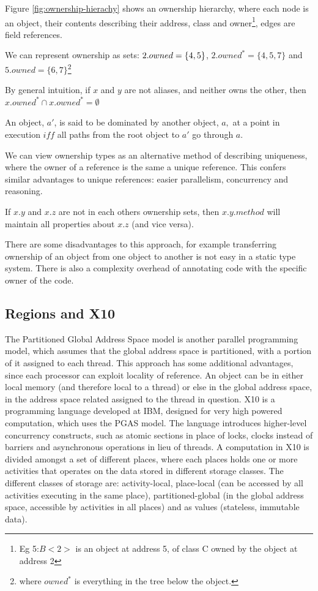 \documentclass[pdftex,11pt,a4paper]{report}
\begin{document}
Figure \ref{fig:ownership-hierachy} shows an ownership hierarchy, where each node is an object, their contents describing their address, class and owner\footnote{Eg 5:$B<2>$ is an object at address 5, of class C owned by the object at address 2}, edges are field references.

We can represent ownership as sets:
$\/2.owned=\{4,5\}$, $2.owned^{*}=\{4,5,7\}$ and $5.owned=\{6,7\}$\footnote{where $owned^{*}$ is everything in the tree below the object.}

By general intuition, if $x$ and $y$ are not aliases, and neither owns the other, then $x.owned^{*} \cap x.owned^{*} = \emptyset$

An object, $a'$, is said to be dominated by another object, $a,$ at a point in execution $iff$ all paths from the root object to $a'$ go through $a$.

We can view ownership types as an alternative method of describing uniqueness, where the owner of a reference is the same a unique reference.
This confers similar advantages to unique references: easier parallelism, concurrency and reasoning.

If $x.y$ and $x.z$ are not in each others ownership sets, then $x.y.method$ will maintain
all properties about $x.z$ (and vice versa).

There are some disadvantages to this approach, for example transferring ownership of an object from one object to another is not easy in a static type system\cite{clarke1998}.
There is also a complexity overhead of annotating code with the specific owner of the code.

\subsection{Regions and X10}
\label{sec:regions}

The Partitioned Global Address Space model\cite{pgas} is another parallel programming model, which assumes that the global address space is partitioned, with a portion of it assigned to each thread.
This approach has some additional advantages, since each processor can exploit locality of reference.
An object can be in either local memory (and therefore local to a thread) or else in the global address space, in the address space related assigned to the thread in question.
X10 is a programming language developed at IBM, designed for very high powered computation, which uses the PGAS model.
The language introduces higher-level concurrency constructs, such as atomic sections in place of locks, clocks instead of barriers and asynchronous operations in lieu of threads\cite{x10}.
A computation in X10 is divided amongst a set of different places, where each places holds one or more activities that operates on the data stored in different storage classes.
The different classes of storage are: activity-local, place-local (can be accessed by all activities executing in the same place), partitioned-global (in the global address space, accessible by activities in all places) and as values (stateless, immutable data)\cite{x10-places}.
\end{document}
